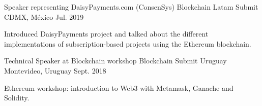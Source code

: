 

\begin{cventries}

  \cventry
    {Speaker representing DaisyPayments.com (ConsenSys)} %
    {Blockchain Latam Submit} %
    {CDMX, México} %
    {Jul. 2019} %
    {
      \begin{cvitems} %
        \item {Introduced DaisyPayments project and talked about the different implementations of subscription-based projects using the Ethereum blockchain.}
      \end{cvitems}
    }
    
    \cventry
    {Technical Speaker at Blockchain workshop} %
    {Blockchain Submit Uruguay} %
    {Montevideo, Uruguay} %
    {Sept. 2018} %
    {
      \begin{cvitems} %
        \item {Ethereum workshop: introduction to Web3 with Metamask, Ganache and Solidity.}
      \end{cvitems}
    }

\end{cventries}
